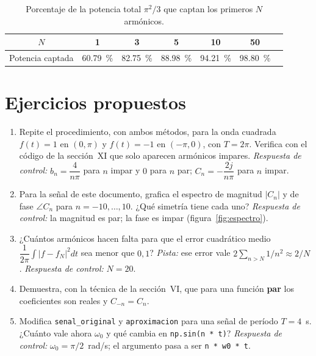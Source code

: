 \documentclass[11pt,a4paper]{article}
\newcommand{\py}[1]{\texttt{#1}}
\begin{document}
\begin{table}[H]
\centering
\caption{Porcentaje de la potencia total $\pi^{2}/3$ que captan los primeros $N$ armónicos.}
\renewcommand{\arraystretch}{1.3}
\begin{tabular}{ccccccc}
\toprule
$N$ & 1 & 3 & 5 & 10 & 50\\
\midrule
Potencia captada & \qty{60.79}{\percent} & \qty{82.75}{\percent} & \qty{88.98}{\percent}
  & \qty{94.21}{\percent} & \qty{98.80}{\percent}\\
\bottomrule
\end{tabular}
\end{table}

\FloatBarrier
\section*{Ejercicios propuestos}
\begin{enumerate}
    \item Repite el procedimiento, con ambos métodos, para la onda cuadrada $f(t)=1$ en
          $(0,\pi)$ y $f(t)=-1$ en $(-\pi,0)$, con $T=2\pi$. Verifica con el código de la
          sección~XI que solo aparecen armónicos impares.
          \textit{Respuesta de control:} $b_n=\dfrac{4}{n\pi}$ para $n$ impar y $0$ para $n$
          par; $C_n=-\dfrac{2j}{n\pi}$ para $n$ impar.
    \item Para la señal de este documento, grafica el espectro de magnitud $|C_n|$ y de fase
          $\angle C_n$ para $n=-10,\dots,10$. ¿Qué simetría tiene cada uno?
          \textit{Respuesta de control:} la magnitud es par; la fase es impar
          (figura~\ref{fig:espectro}).
    \item ¿Cuántos armónicos hacen falta para que el error cuadrático medio
          $\dfrac{1}{2\pi}\displaystyle\int|f-f_N|^{2}dt$ sea menor que $0{,}1$?
          \textit{Pista:} ese error vale $2\sum_{n>N}1/n^{2}\approx 2/N$.
          \textit{Respuesta de control:} $N=20$.
    \item Demuestra, con la técnica de la sección~VI, que para una función \textbf{par} los
          coeficientes son reales y $C_{-n}=C_n$.
    \item Modifica \py{senal\_original} y \py{aproximacion} para una señal de período
          $T=4$~s. ¿Cuánto vale ahora $\omega_0$ y qué cambia en \py{np.sin(n * t)}?
          \textit{Respuesta de control:} $\omega_0=\pi/2$~rad/s; el argumento pasa a ser
          \py{n * w0 * t}.
\end{enumerate}
\end{document}
